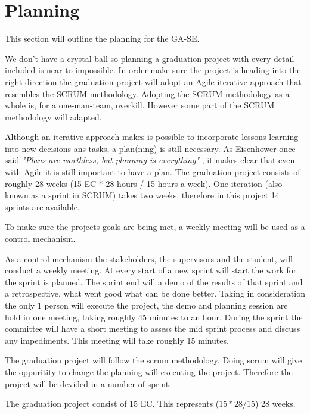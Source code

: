 \section{Planning} \label{planning}
This section will outline the planning for the GA-SE.

We don't have a crystal ball so planning a graduation project with every detail included is near to impossible. In order make sure the project is heading into the right direction the graduation project will adopt an Agile iterative approach that resembles the SCRUM methodology. Adopting the SCRUM methodology as a whole is, for a one-man-team, overkill. However some part of the SCRUM methodology will adapted. 

Although an iterative approach makes is possible to incorporate lessons learning into new decisions ans tasks, a plan(ning) is still necessary. As Eisenhower once said \textit{"Plans are worthless, but planning is everything" } \cite{eisenhower-quote},   it makes clear that even with Agile it is still important to have a plan. The graduation project consists of roughly 28 weeks (15 EC * 28 hours / 15 hours a week). One iteration (also known as a sprint in SCRUM) takes two weeks, therefore in this project 14 sprints are available. 

To make sure the projects goals are being met, a weekly meeting will be used as a control mechanism.

As a control mechanism the stakeholders, the supervisors and the student, will conduct a weekly meeting. At every start of a new sprint will start the work for the sprint is planned. The sprint end will a demo of the results of that sprint and a retrospective, what went good what can be done better. Taking in consideration the only 1 person will execute the project, the demo and planning session are hold in one meeting, taking roughly 45 minutes to an hour. During the sprint the committee will have a short meeting to assess the mid sprint process and discuss any impediments. This meeting will take roughly 15 minutes. 


The graduation project will follow the scrum methodology. Doing scrum will give the oppuritity to change the planning will executing the project. Therefore the project will be devided in a number of sprint.

The graduation project consist of 15 EC. This represents ($15*28/15$) 28 weeks. 

